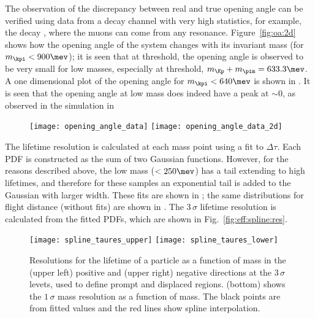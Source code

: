 The observation of the discrepancy between real and true opening angle can be verified using data
from a decay channel with very high statistics, for example,
the decay \decay{\Bd}{\kpi\mumu}, where the muons can come from any resonance.
Figure~\ref{fig:oa:2d} shows how the opening angle of the \kpi system changes with its invariant
mass (for $m_{\kpi}<900\mev$); it is seen that at threshold, the opening angle is observed to be
very small for low masses, especially at threshold, $m_{\Kp} + m_{\pim} = 633.3\mev$.
A one dimensional plot of the opening angle for $m_{\kpi}<640\mev$ is shown in .
It is seen that the \kpi opening angle at low mass does indeed have a peak at $\sim\!0$, as
observed in the simulation in 

\begin{figure}
  \begin{center}
    \texttt{[image: opening\_angle\_data]}
    \texttt{[image: opening\_angle\_data\_2d]}
    \caption[Opening angle of \kpi]
    {
    }
    \label{fig:db:openkpi}
  \end{center}
\end{figure}

The lifetime resolution is calculated at each mass point using a fit to $\Delta\tau$.
Each PDF is constructed as the sum of two Gaussian functions.
However, for the reasons described above, the low mass ($<250\mev$) has a tail extending to high
lifetimes, and therefore for these samples an exponential tail is added to the Gaussian with larger
width.
These fits are shown in ; the same distributions for flight distance (without
fits) are shown in .
The $3\,\sigma$ lifetime resolution is calculated from the fitted PDFs, which are
shown in Fig.~\ref{fig:eff:spline:res}.


\begin{figure}
  \begin{center}
    \texttt{[image: spline\_taures\_upper]}
    \texttt{[image: spline\_taures\_lower]}\\
    \caption{
      Resolutions for the lifetime of a particle as a function of mass in the
      (upper left) positive and
      (upper right) negative directions at the $3\,\sigma$ levets, used to
      define prompt and displaced regions.
      (bottom) shows the $1\,\sigma$ mass resolution as a function of
      mass.
      The black points are from fitted values and the red lines show spline interpolation.
    }
    \label{fig:eff:res}
  \end{center}
\end{figure}



